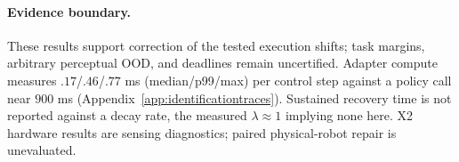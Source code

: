 \paragraph{Evidence boundary.}
These results support correction of the tested execution shifts; task
margins, arbitrary perceptual OOD, and deadlines remain uncertified. Adapter
compute measures $.17$/$.46$/$.77$ ms (median/p99/max) per control step
against a policy call near $900$ ms
(Appendix~\ref{app:identificationtraces}). Sustained recovery time is not
reported against a decay rate, the measured $\lambda\approx1$ implying none
here. X2 hardware results are sensing diagnostics; paired physical-robot
repair is unevaluated.
